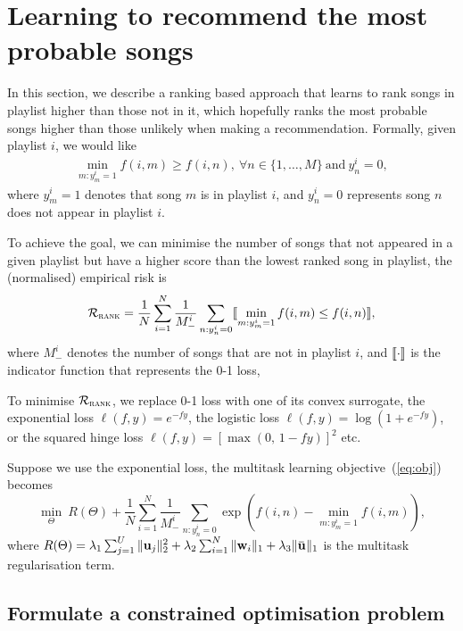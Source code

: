 \section{Learning to recommend the most probable songs}

In this section, we describe a ranking based approach that learns to rank songs in playlist higher 
than those not in it, which hopefully ranks the most probable songs higher than those unlikely when making a recommendation.
Formally, given playlist $i$, we would like
\begin{equation*}
\begin{aligned}
\min_{m: y_m^i = 1} f(i, m) \ge f(i, n), \ \forall n \in \{1,\dots,M\} \ \text{and} \ y_n^i = 0,
\end{aligned}
\end{equation*}
where $y_m^i = 1$ denotes that song $m$ is in playlist $i$,
and $y_n^i = 0$ represents song $n$ does not appear in playlist $i$.

To achieve the goal, we can minimise the number of songs that not appeared in a given playlist
but have a higher score than the lowest ranked song in playlist, \ie the (normalised) empirical risk is
\begin{equation}
\label{eq:bp}
\mathcal{R}_\textsc{rank} = \frac{1}{N} \sum_{i=1}^N \frac{1}{M_-^i} \sum_{n: y_n^i = 0} \llbracket \min_{m: y_m^i = 1} f(i, m) \le f(i, n) \rrbracket,
\end{equation}
where $M_-^i$ denotes the number of songs that are not in playlist $i$,
and $\llbracket \cdot \rrbracket$ is the indicator function that represents the 0-1 loss,

To minimise $\mathcal{R}_\textsc{rank}$, we replace 0-1 loss with one of its convex surrogate,
\eg the exponential loss $\ell(f, y) = e^{-fy}$, the logistic loss $\ell(f, y) = \log(1 + e^{-fy})$,
or the squared hinge loss $\ell(f, y) = [\max(0, \, 1 - fy)]^2$ etc.

Suppose we use the exponential loss, the multitask learning objective~(\ref{eq:obj}) becomes
\begin{equation}
\label{eq:expobj}
\min_{\Theta} \ R(\Theta) + \frac{1}{N} \sum_{i=1}^N \frac{1}{M_-^i} \sum_{n: y_n^i = 0} \exp \left(f(i, n) - \min_{m: y_m^i = 1} f(i, m) \right),
\end{equation}
where $R(\Theta) = \lambda_1 \sum_{j=1}^U \|\bu_j\|_2^2 + \lambda_2 \sum_{i=1}^N \|\w_i\|_1 + \lambda_3 \|\widebar\bu\|_1$ 
is the multitask regularisation term.


\subsection{Formulate a constrained optimisation problem}

